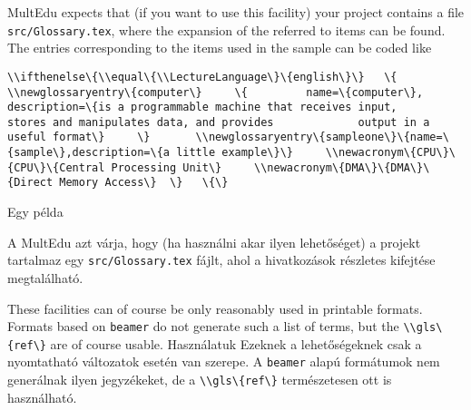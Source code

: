 {
MultEdu expects that (if you want to use this facility) your project
contains a file \lstinline|src/Glossary.tex|, where the expansion
of the referred to items can be found. The entries corresponding 
to the items used in the sample can be coded like

\lstinline|\\ifthenelse\{\\equal\{\\LectureLanguage\}\{english\}\}
  \{
	\\newglossaryentry\{computer\}
	\{
		name=\{computer\},
		description=\{is a programmable machine that receives input,
			stores and manipulates data, and provides
			output in a useful format\}
	\}	
	\\newglossaryentry\{sampleone\}\{name=\{sample\},description=\{a little example\}\}
    \\newacronym\{CPU\}\{CPU\}\{Central Processing Unit\}
    \\newacronym\{DMA\}\{DMA\}\{Direct Memory Access\}
 \}	
 \{\}|

}
{Egy példa}
{
A MultEdu azt várja, hogy (ha használni akar ilyen lehetőséget) a projekt
tartalmaz egy \lstinline|src/Glossary.tex| fájlt,
ahol a hivatkozások részletes kifejtése megtalálható.

}



{
These facilities can of course be only reasonably used in printable formats.
Formats based on \lstinline|beamer| do not generate such a list of terms,
but the \lstinline|\\gls\{ref\}|  are of course usable.
}
{Használatuk}
{
Ezeknek a lehetőségeknek csak a nyomtatható változatok esetén van szerepe.
A \lstinline|beamer| alapú formátumok nem generálnak ilyen jegyzékeket,
de a \lstinline|\\gls\{ref\}| természetesen ott is használható.
}


